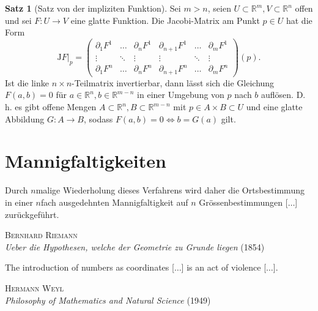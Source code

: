 \documentclass[a4paper]{scrbook}
\numberwithin{equation}{chapter}
\newcommand{\R}{\mathbb{R}}
\theoremstyle{definition}
\newtheorem{satz}[defn]{Satz}
\begin{document}
\begin{satz}[Satz von der impliziten Funktion] \label{satz:impl_fkt}
	Sei $m > n$, seien $U \subset \R^m, V \subset \R^n$ offen und sei $F\colon U \to V$ eine glatte Funktion. Die Jacobi-Matrix am Punkt $p \in U$ hat die Form
	\[\left.\mathrm{J}F\right|_p = \begin{pmatrix}
		\partial_1 F^1 & \dots & \partial_n F^1 & \partial_{n+1} F^1 & \dots & \partial_m F^1 \\
		\vdots & \ddots & \vdots & \vdots & \ddots & \vdots \\
		\partial_1 F^n & \dots & \partial_n F^n & \partial_{n+1} F^n & \dots & \partial_m F^n
	\end{pmatrix} (p).\]
	Ist die linke $n\times n$-Teilmatrix invertierbar, dann lässt sich die Gleichung $F(a,b) = 0$ für $a \in \R^n, b \in \R^{m-n}$ in einer Umgebung von $p$ nach $b$ auflösen. D.\,h. es gibt offene Mengen $A \subset \R^n, B \subset \R^{m-n}$ mit $p \in A\times B \subset U$ und eine glatte Abbildung $G\colon A\to B$, sodass $F(a,b) = 0 \iff b = G(a)$ gilt.
\end{satz}


\chapter{Mannigfaltigkeiten}
\epigraph{Durch $n$malige Wiederholung dieses Verfahrens wird daher die Ortsbestimmung in einer $n$fach ausgedehnten Mannigfaltigkeit auf $n$ Grössenbestimmungen [$\ldots$] zurückgeführt.}{\textsc{Bernhard Riemann}\\\emph{Ueber die Hypothesen, welche der Geometrie zu Grunde liegen} (1854)}
\epigraph{The introduction of numbers as coordinates [$\ldots$] is an act of violence [$\ldots$].}{\textsc{Hermann Weyl}\\\emph{Philosophy of Mathematics and Natural Science} (1949)}
\end{document}
